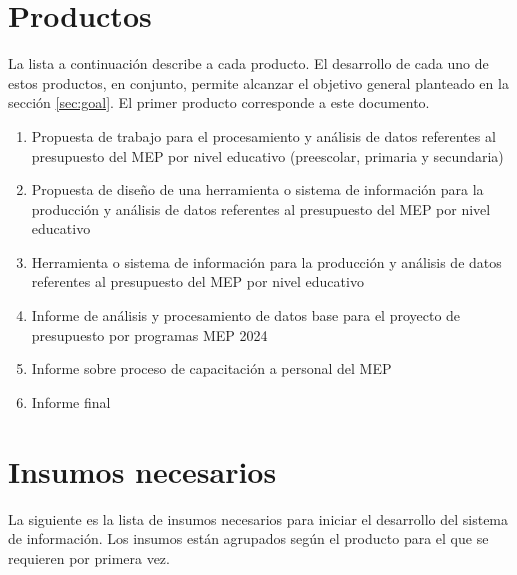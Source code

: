 \documentclass[a4paper, 9pt, conference]{article}              %
\theoremstyle{definition}
\begin{document}
\section{Productos}

La lista a continuaci\'on describe a cada producto. El desarrollo de cada uno de estos productos, en conjunto, permite alcanzar el objetivo general planteado en la secci\'on \ref{sec:goal}. El primer producto corresponde a este documento.

\begin{enumerate}
	\item Propuesta de trabajo para el procesamiento y an\'alisis de datos referentes al presupuesto del MEP por nivel educativo (preescolar, primaria y
	secundaria) \cite{trd}
	\item Propuesta de dise\~no de una herramienta o sistema de informaci\'on para la producci\'on y an\'alisis de datos referentes al presupuesto del MEP por nivel
	educativo \cite{trd}
	\item Herramienta o sistema de informaci\'on para la producci\'on y an\'alisis de datos referentes al presupuesto del MEP por nivel educativo \cite{trd}
	\item Informe de an\'alisis y procesamiento de datos base para el proyecto de presupuesto por programas MEP 2024 \cite{trd}
	\item Informe sobre proceso de capacitaci\'on a personal del MEP \cite{trd}
	\item Informe final \cite{trd}
\end{enumerate}

\section{Insumos necesarios}

La siguiente es la lista de insumos necesarios para iniciar el desarrollo del sistema de informaci\'on. Los insumos est\'an agrupados seg\'un el producto para el que se requieren por primera vez.
\end{document}
